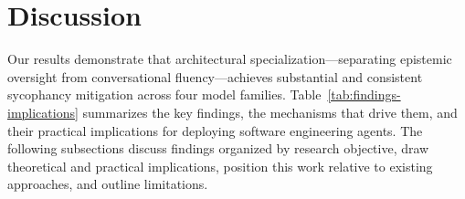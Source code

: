 
\section{Discussion}
\label{sec:discussion}

Our results demonstrate that architectural specialization---separating epistemic oversight from conversational fluency---achieves substantial and consistent sycophancy mitigation across four model families. Table~\ref{tab:findings-implications} summarizes the key findings, the mechanisms that drive them, and their practical implications for deploying software engineering agents. The following subsections discuss findings organized by research objective, draw theoretical and practical implications, position this work relative to existing approaches, and outline limitations.


